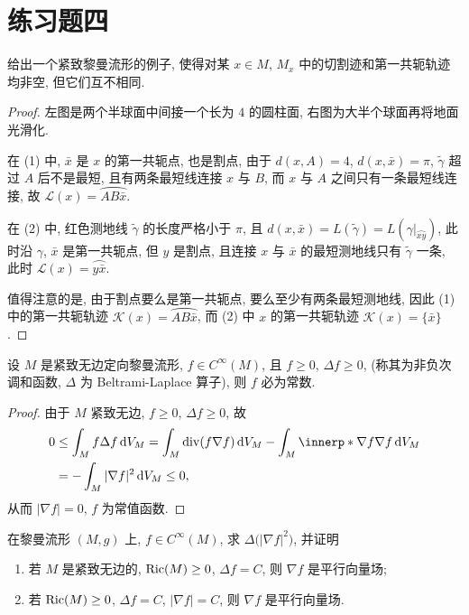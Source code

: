 \section{练习题四}



\begin{exercise}[2]
  给出一个紧致黎曼流形的例子, 使得对某 $x\in M$, $M_x$
  中的切割迹和第一共轭轨迹均非空, 但它们互不相同.
\end{exercise}

\begin{proof}
  左图是两个半球面中间接一个长为 $4$ 的圆柱面, 右图为大半个球面再将地面光滑化.

  在 (1) 中, $\bar{x}$ 是 $x$ 的第一共轭点, 也是割点, 由于 $d(x,A)=4$,
  $d(x,\bar{x})=\pi$, $\tilde{\gamma}$ 超过 $A$ 后不是最短, 且有两条最短线连接
  $x$ 与 $B$, 而 $x$ 与 $A$ 之间只有一条最短线连接, 故 $\mathscr{L}(x)=\wideparen{AB\bar{x}}$.

  在 (2) 中, 红色测地线 $\tilde{\gamma}$ 的长度严格小于 $\pi$, 且
  $d(x,\bar{x})=L(\tilde{\gamma})=L(\gamma|_{\wideparen{xy}})$,
  此时沿 $\gamma$, $\bar{x}$ 是第一共轭点, 但 $y$ 是割点, 且连接 $x$ 与 $\bar{x}$
  的最短测地线只有 $\tilde{\gamma}$ 一条, 此时 $\mathscr{L}(x)=\wideparen{y\bar{x}}$.

  值得注意的是, 由于割点要么是第一共轭点, 要么至少有两条最短测地线, 因此 (1)
  中的第一共轭轨迹 $\mathscr{K}(x)=\wideparen{AB\bar{x}}$,
  而 (2) 中 $x$ 的第一共轭轨迹 $\mathscr{K}(x)=\{\bar{x}\}$.
\end{proof}

\begin{exercise}[7]
  设 $M$ 是紧致无边定向黎曼流形, $f\in C^{\infty}(M)$, 且 $f\geq 0$, $\Delta f\geq 0$,
  (称其为非负次调和函数, $\Delta$ 为 Beltrami-Laplace 算子), 则 $f$ 必为常数.
\end{exercise}

\begin{proof}
  由于 $M$ 紧致无边, $f\geq 0$, $\Delta f\geq 0$, 故
  \begin{align*}
    0
    & \leq \int_M f\Delta f\diff V_M = \int_M \div(f\nabla f)\diff V_M - \int_M \innerp*{\nabla f}{\nabla f}\diff V_M \\
    & = -\int_M |\nabla f|^2\diff V_M\leq 0,
  \end{align*}
  从而 $|\nabla f|=0$, $f$ 为常值函数.
\end{proof}



\begin{exercise}[9]
  在黎曼流形 $(M,g)$ 上, $f\in C^{\infty}(M)$, 求 $\Delta\bigl(|\nabla f|^2\bigr)$, 并证明
  \begin{enumerate}[(1)]
    \item 若 $M$ 是紧致无边的, $\operatorname{Ric}(M)\geq 0$, $\Delta f=C$, 则 $\nabla f$ 是平行向量场;
    \item 若 $\operatorname{Ric}(M)\geq 0$, $\Delta f=C$, $|\nabla f|=C$, 则 $\nabla f$ 是平行向量场.
  \end{enumerate}
\end{exercise}

